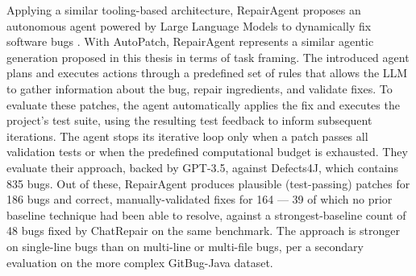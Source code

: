 Applying a similar tooling-based architecture, RepairAgent proposes an autonomous agent powered by Large Language Models to dynamically fix software bugs \cite{bouzenia2025repairagent}. 
With AutoPatch, RepairAgent represents a similar agentic generation proposed in this thesis in terms of task framing. 
The introduced agent plans and executes actions through a predefined set of rules that allows the LLM to gather information about the bug, repair ingredients, and validate fixes.
To evaluate these patches, the agent automatically applies the fix and executes the project's test suite, using the resulting test feedback to inform subsequent iterations. 
The agent stops its iterative loop only when a patch passes all validation tests or when the predefined computational budget is exhausted.
They evaluate their approach, backed by GPT-3.5, against Defects4J, which contains 835 bugs. 
Out of these, RepairAgent produces plausible (test-passing) patches for 186 bugs and correct, manually-validated fixes for 164 — 39 of which no prior baseline technique had been able to resolve, against a strongest-baseline count of 48 bugs fixed by ChatRepair on the same benchmark. 
The approach is stronger on single-line bugs than on multi-line or multi-file bugs, per a secondary evaluation on the more complex GitBug-Java dataset.

